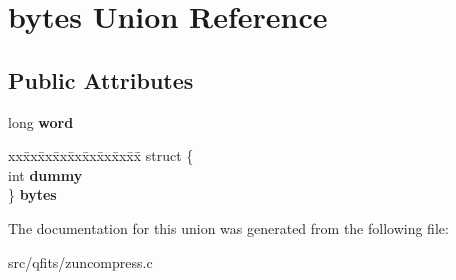 \hypertarget{unionbytes}{}\section{bytes Union Reference}
\label{unionbytes}
\subsection*{Public Attributes}
\begin{DoxyCompactItemize}
\item 
\mbox{\label{unionbytes_a848deed7a6a61e66bc77e8e1db2b0cd0}} 
long {\bfseries word}
\item 
\mbox{\label{unionbytes_a5ed5333b1677f71944c761f15a73692e}} 
\begin{tabbing}
xx\=xx\=xx\=xx\=xx\=xx\=xx\=xx\=xx\=\kill
struct \{\\
\>int {\bfseries dummy}\\
\} {\bfseries bytes}\\

\end{tabbing}\end{DoxyCompactItemize}


The documentation for this union was generated from the following file\+:\begin{DoxyCompactItemize}
\item 
src/qfits/zuncompress.\+c\end{DoxyCompactItemize}
